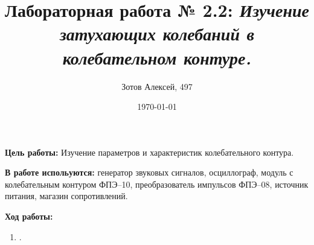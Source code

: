 \documentclass[10pt]{article}
\title{Лабораторная работа № 2.2: {\it Изучение затухающих колебаний в колебательном контуре.}}
\author{Зотов Алексей, 497}
\date{\today}
\begin{document}
\maketitle
\textbf{Цель работы:} Изучение параметров и характеристик колебательного контура.

\textbf{В работе испольуются:} \small{генератор звуковых сигналов, осциллограф, модуль с колебательным контуром ФПЭ–10, преобразователь импульсов ФПЭ–08, источник питания, магазин сопротивлений.}

\textbf{Ход работы:}
    \begin{enumerate}
    \item .
    \end{enumerate}
\end{document}
